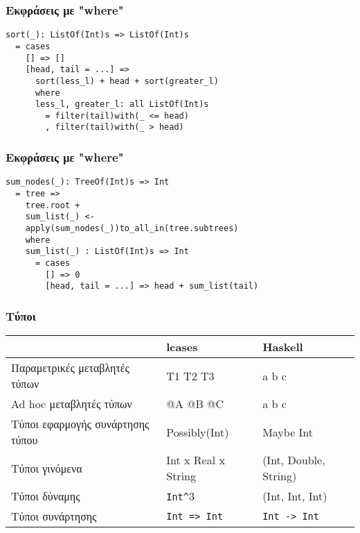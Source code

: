 \documentclass{beamer}
\def\e{\foreignlanguage{english}}
\def\h{\e{Haskell}}
\begin{document}
\begin{frame}[fragile]

\frametitle{Εκφράσεις με \e{"where"}}

\begin{otherlanguage}{english}
\begin{verbatim}
sort(_): ListOf(Int)s => ListOf(Int)s
  = cases
    [] => []
    [head, tail = ...] =>
      sort(less_l) + head + sort(greater_l)
      where
      less_l, greater_l: all ListOf(Int)s
        = filter(tail)with(_ <= head)
        , filter(tail)with(_ > head)

\end{verbatim}
\end{otherlanguage}

\end{frame}

\begin{frame}[fragile]

\frametitle{Εκφράσεις με \e{"where"}}

\begin{otherlanguage}{english}
\begin{verbatim}
sum_nodes(_): TreeOf(Int)s => Int
  = tree =>
    tree.root +
    sum_list(_) <-
    apply(sum_nodes(_))to_all_in(tree.subtrees)
    where
    sum_list(_) : ListOf(Int)s => Int
      = cases
        [] => 0
        [head, tail = ...] => head + sum_list(tail)

\end{verbatim}
\end{otherlanguage}

\end{frame}

\begin{frame}

\frametitle{Τύποι}

\begin{center}
\begin{tabular}{ |M{2.5cm}|M{3cm}|M{4.3cm}| }
 \hline
 & \e{lcases} & \h
 \\
 \hline
 Παραμετρικές μεταβλητές τύπων & T1 T2 T3 & \e{a b c}
 \\
 \hline
 \e{Ad hoc} μεταβλητές τύπων & \e{@A @B @C} & \e{a b c}
 \\
 \hline
 Τύποι εφαρμογής συνάρτησης τύπου & \e{Possibly(Int)} & \e{Maybe Int}
 \\
 \hline
 Τύποι γινόμενα & \e{Int x Real x String} & \e{(Int, Double, String)}
 \\
 \hline
 Τύποι δύναμης & \e{\texttt{Int\^}}\e{3} & \e{(Int, Int, Int)}
 \\
 \hline
 Τύποι συνάρτησης & \e{\texttt{Int => Int}} & \e{\texttt{Int -> Int}}
 \\
 \hline
\end{tabular}
\end{center}

\end{frame}
\end{document}
